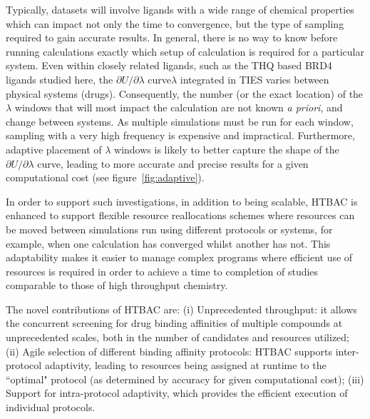 \documentclass[conference]{IEEEtran}
\begin{document}
Typically, datasets will involve ligands with a wide range of chemical 
properties which can impact not only the time to convergence, but the type 
of sampling required to gain accurate results.
In general, there is no way to know before running
calculations exactly which setup of calculation is required for a particular
system. 
Even within closely related ligands, such as the THQ based BRD4 ligands 
studied here, the $\partial U/\partial\lambda$ curve$\lambda$ integrated in TIES 
varies between physical systems (drugs). 
Consequently, the number (or the exact location) of the
$\lambda$ windows that will most impact the calculation are not known
\textit{a priori}, and change between systems. 
As multiple
simulations must be run for each window, sampling with a very high frequency
is expensive and impractical. Furthermore, adaptive placement of $\lambda$
windows is likely to better capture the shape of the
$\partial U/\partial\lambda$ curve, leading to more accurate and precise
results for a given computational cost (see figure~\ref{fig:adaptive}).



In order to support such
investigations, in addition to being scalable, HTBAC is enhanced to
support flexible resource reallocations schemes where resources can be moved
between simulations run using different protocols or systems, for example,
when one calculation has converged whilst another has not. This adaptability
makes it easier to manage complex programs where efficient use of resources
is required in order to achieve a time to completion of studies comparable to
those of high throughput chemistry.

The novel contributions of HTBAC are: (i) Unprecedented throughput: it allows
the concurrent screening for drug binding affinities of multiple compounds at
unprecedented scales, both in the number of candidates and resources utilized;
(ii) Agile selection of different binding affinity protocols: HTBAC supports
inter-protocol adaptivity, leading to resources being assigned at runtime to
the ``optimal" protocol (as determined by accuracy for given computational
cost); (iii) Support for intra-protocol adaptivity, which provides the
efficient execution of individual protocols.



\end{document}
